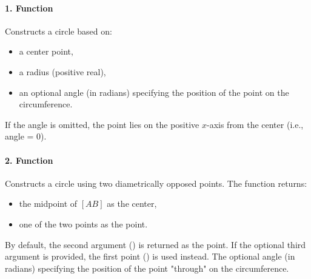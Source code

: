 \paragraph{1. Function \code{through(center, radius, <angle>])}}
Constructs a circle based on:
\begin{itemize}
  \item a center point,
  \item a radius (positive real),
  \item an optional angle (in radians) specifying the position of the point on the circumference.
\end{itemize}
If the angle is omitted, the point lies on the positive \(x\)-axis from the center (i.e., angle = 0).

\paragraph{2. Function }

Constructs a circle using two diametrically opposed points. The function returns:

\begin{itemize}
  \item the midpoint of \([AB]\) as the center,
  \item one of the two points as the  point.
\end{itemize}

By default, the second argument () is returned as the  point. If the optional third argument  is provided, the first point () is used instead. The optional angle (in radians) specifying the position of the point "through" on the circumference.

\vspace{1em}

\begin{tkzexample}[latex=6cm]
\end{tkzexample}

